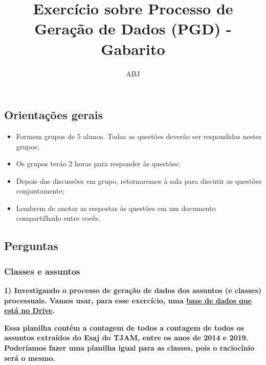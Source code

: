 \documentclass[
  letterpaper,
  DIV=11,
  numbers=noendperiod]{scrartcl}
\title{Exercício sobre Processo de Geração de Dados (PGD) - Gabarito}
\author{ABJ}
\date{}
\providecommand{\tightlist}{%
  \setlength{\itemsep}{0pt}\setlength{\parskip}{0pt}}\usepackage{longtable,booktabs,array}
\begin{document}
\maketitle
\ifdefined\Shaded\renewenvironment{Shaded}{\begin{tcolorbox}[boxrule=0pt, sharp corners, interior hidden, enhanced, breakable, frame hidden, borderline west={3pt}{0pt}{shadecolor}]}{\end{tcolorbox}}\fi

\hypertarget{orientauxe7uxf5es-gerais}{%
\subsection{Orientações gerais}\label{orientauxe7uxf5es-gerais}}

\begin{itemize}
\tightlist
\item
  Formem grupos de 5 alunos. Todas as questões deverão ser respondidas
  nestes grupos;
\item
  Os grupos terão 2 horas para responder às questões;
\item
  Depois das discussões em grupo, retornaremos à sala para discutir as
  questões conjuntamente;
\item
  Lembrem de anotar as respostas às questões em um documento
  compartilhado entre vocês.
\end{itemize}

\newpage{}

\hypertarget{perguntas}{%
\subsection{Perguntas}\label{perguntas}}

\hypertarget{classes-e-assuntos}{%
\subsubsection{Classes e assuntos}\label{classes-e-assuntos}}

\textbf{1) Investigando o processo de geração de dados dos assuntos (e
classes) processuais. Vamos usar, para esse exercício, uma
\href{https://docs.google.com/spreadsheets/d/1W0a0MPpszNYEbS6x8ytDwYF78rcU8_qhgOO4ke22sSw/edit\#gid=0}{base
de dados que está no Drive}.}

\textbf{Essa planilha contém a contagem de todos a contagem de todos os
assuntos extraídos do Esaj do TJAM, entre os anos de 2014 e 2019.
Poderíamos fazer uma planilha igual para as classes, pois o raciocínio
será o mesmo.}
\end{document}
